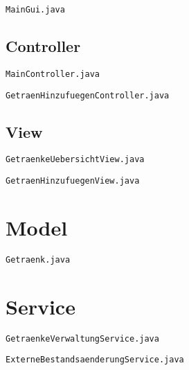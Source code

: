 \verb|MainGui.java|



\subsection{Controller}

\verb|MainController.java|



\verb|GetraenHinzufuegenController.java|



\subsection{View}

\verb|GetraenkeUebersichtView.java|



\verb|GetraenHinzufuegenView.java|



\section{Model}

\verb|Getraenk.java|



\section{Service}

\verb|GetraenkeVerwaltungService.java|



\verb|ExterneBestandsaenderungService.java|

